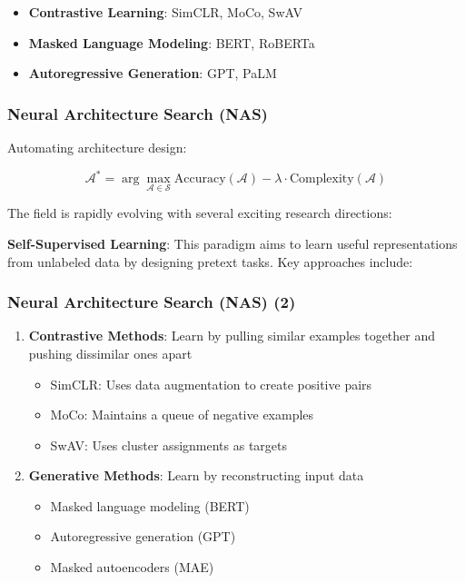 \documentclass[
]{article}
\providecommand{\tightlist}{%
  \setlength{\itemsep}{0pt}\setlength{\parskip}{0pt}}
\begin{document}
\begin{itemize}
\tightlist
\item
  \textbf{Contrastive Learning}: SimCLR, MoCo, SwAV
\item
  \textbf{Masked Language Modeling}: BERT, RoBERTa
\item
  \textbf{Autoregressive Generation}: GPT, PaLM
\end{itemize}

\subsubsection{Neural Architecture Search
(NAS)}\label{neural-architecture-search-nas}

Automating architecture design:

\[\mathcal{A}^* = \arg\max_{\mathcal{A} \in \mathcal{S}} \text{Accuracy}(\mathcal{A}) - \lambda \cdot \text{Complexity}(\mathcal{A})\]

The field is rapidly evolving with several exciting research directions:

\textbf{Self-Supervised Learning}: This paradigm aims to learn useful
representations from unlabeled data by designing pretext tasks. Key
approaches include:

\subsubsection{Neural Architecture Search (NAS)
(2)}\label{neural-architecture-search-nas-2}

\begin{enumerate}
\def\labelenumi{\arabic{enumi}.}
\tightlist
\item
  \textbf{Contrastive Methods}: Learn by pulling similar examples
  together and pushing dissimilar ones apart

  \begin{itemize}
  \tightlist
  \item
    SimCLR: Uses data augmentation to create positive pairs
  \item
    MoCo: Maintains a queue of negative examples
  \item
    SwAV: Uses cluster assignments as targets
  \end{itemize}
\item
  \textbf{Generative Methods}: Learn by reconstructing input data

  \begin{itemize}
  \tightlist
  \item
    Masked language modeling (BERT)
  \item
    Autoregressive generation (GPT)
  \item
    Masked autoencoders (MAE)
  \end{itemize}
\end{enumerate}
\end{document}
